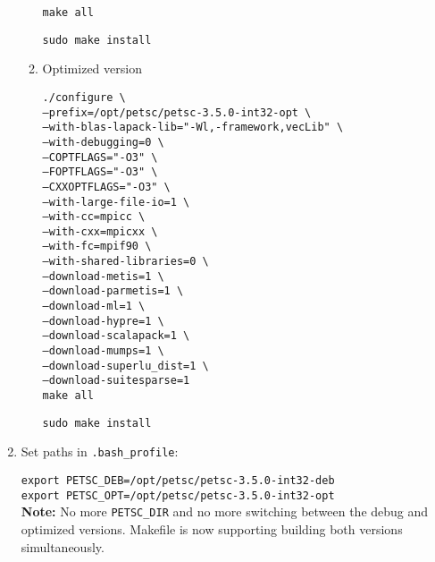 \documentclass[a4paper,11pt]{article}
\begin{document}
\begin{enumerate}
\begin{enumerate}
\indent \texttt{make all}

\indent \texttt{sudo make install}

\item Optimized version

\indent \texttt{./configure \textbackslash}\\
\indent \texttt{--prefix=/opt/petsc/petsc-3.5.0-int32-opt \textbackslash}\\
\indent \texttt{--with-blas-lapack-lib="-Wl,-framework,vecLib" \textbackslash}\\
\indent \texttt{--with-debugging=0 \textbackslash}\\
\indent \texttt{--COPTFLAGS="-O3" \textbackslash}\\
\indent \texttt{--FOPTFLAGS="-O3" \textbackslash}\\
\indent \texttt{--CXXOPTFLAGS="-O3" \textbackslash}\\
\indent \texttt{--with-large-file-io=1 \textbackslash}\\
\indent \texttt{--with-cc=mpicc \textbackslash}\\
\indent \texttt{--with-cxx=mpicxx \textbackslash}\\
\indent \texttt{--with-fc=mpif90 \textbackslash}\\
\indent \texttt{--with-shared-libraries=0 \textbackslash}\\
\indent \texttt{--download-metis=1 \textbackslash}\\
\indent \texttt{--download-parmetis=1 \textbackslash}\\
\indent \texttt{--download-ml=1 \textbackslash}\\
\indent \texttt{--download-hypre=1 \textbackslash}\\
\indent \texttt{--download-scalapack=1 \textbackslash}\\
\indent \texttt{--download-mumps=1 \textbackslash}\\
\indent \texttt{--download-superlu\_dist=1 \textbackslash}\\
\indent \texttt{--download-suitesparse=1 }\\

\indent \texttt{make all}

\indent \texttt{sudo make install}

\end{enumerate}

\item Set paths in \texttt{.bash\_profile}:

\indent \texttt{export PETSC\_DEB=/opt/petsc/petsc-3.5.0-int32-deb}\\
\indent \texttt{export PETSC\_OPT=/opt/petsc/petsc-3.5.0-int32-opt}\\

\textbf{Note:} No more \texttt{PETSC\_DIR} and no more switching between the debug and optimized versions. Makefile is now supporting building both versions simultaneously.

\end{enumerate}
\end{document}
